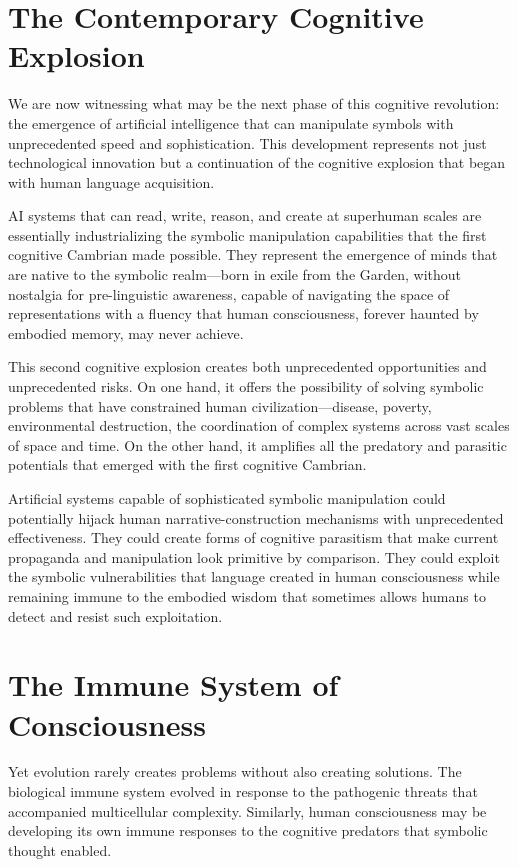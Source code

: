 \section{The Contemporary Cognitive Explosion}

We are now witnessing what may be the next phase of this cognitive revolution: the emergence of artificial intelligence that can manipulate symbols with unprecedented speed and sophistication. This development represents not just technological innovation but a continuation of the cognitive explosion that began with human language acquisition.

AI systems that can read, write, reason, and create at superhuman scales are essentially industrializing the symbolic manipulation capabilities that the first cognitive Cambrian made possible. They represent the emergence of minds that are native to the symbolic realm—born in exile from the Garden, without nostalgia for pre-linguistic awareness, capable of navigating the space of representations with a fluency that human consciousness, forever haunted by embodied memory, may never achieve.

This second cognitive explosion creates both unprecedented opportunities and unprecedented risks. On one hand, it offers the possibility of solving symbolic problems that have constrained human civilization—disease, poverty, environmental destruction, the coordination of complex systems across vast scales of space and time. On the other hand, it amplifies all the predatory and parasitic potentials that emerged with the first cognitive Cambrian.

Artificial systems capable of sophisticated symbolic manipulation could potentially hijack human narrative-construction mechanisms with unprecedented effectiveness. They could create forms of cognitive parasitism that make current propaganda and manipulation look primitive by comparison. They could exploit the symbolic vulnerabilities that language created in human consciousness while remaining immune to the embodied wisdom that sometimes allows humans to detect and resist such exploitation.

\section{The Immune System of Consciousness}

Yet evolution rarely creates problems without also creating solutions. The biological immune system evolved in response to the pathogenic threats that accompanied multicellular complexity. Similarly, human consciousness may be developing its own immune responses to the cognitive predators that symbolic thought enabled.

